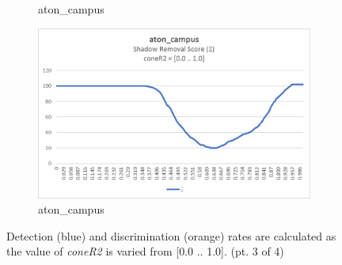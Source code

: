 \begin{appendices}
\begin{figure}
\begin{subfigure}{.45\linewidth}
  \caption{aton\_campus}
\end{subfigure}
\hfill
\begin{subfigure}{.45\linewidth}
  \includegraphics[width=1\linewidth]{figures/appendix/campus_coneR2_score.jpg}
  \caption{aton\_campus}
\end{subfigure}
\caption{Detection (blue) and discrimination (orange) rates are calculated as the value of \textit{coneR2} is varied from [0.0 .. 1.0]. (pt. 3 of 4)}

\end{figure}

\begin{figure}


\end{figure}
\end{appendices}
